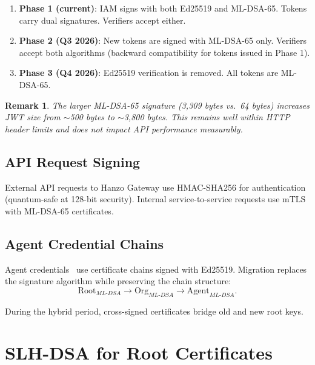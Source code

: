 \documentclass[11pt]{article}
\newtheorem{remark}{Remark}
\begin{document}
\begin{enumerate}[leftmargin=1.4em]
    \item \textbf{Phase 1 (current)}: IAM signs with both Ed25519 and ML-DSA-65.
    Tokens carry dual signatures. Verifiers accept either.
    \item \textbf{Phase 2 (Q3 2026)}: New tokens are signed with ML-DSA-65 only.
    Verifiers accept both algorithms (backward compatibility for tokens issued
    in Phase 1).
    \item \textbf{Phase 3 (Q4 2026)}: Ed25519 verification is removed. All
    tokens are ML-DSA-65.
\end{enumerate}

\begin{remark}
The larger ML-DSA-65 signature (3,309 bytes vs.\ 64 bytes) increases JWT size
from $\sim$500 bytes to $\sim$3,800 bytes. This remains well within HTTP header
limits and does not impact API performance measurably.
\end{remark}

\subsection{API Request Signing}

External API requests to Hanzo Gateway use HMAC-SHA256 for authentication
(quantum-safe at 128-bit security). Internal service-to-service requests use
mTLS with ML-DSA-65 certificates.

\subsection{Agent Credential Chains}

Agent credentials~\cite{hanzoagentsdk} use certificate chains signed with
Ed25519. Migration replaces the signature algorithm while preserving the chain
structure:
\begin{equation}
\text{Root}_{ML\text{-}DSA} \to \text{Org}_{ML\text{-}DSA} \to
\text{Agent}_{ML\text{-}DSA}.
\end{equation}

During the hybrid period, cross-signed certificates bridge old and new root
keys.

\section{SLH-DSA for Root Certificates}
\label{sec:slhdsa}
\end{document}

